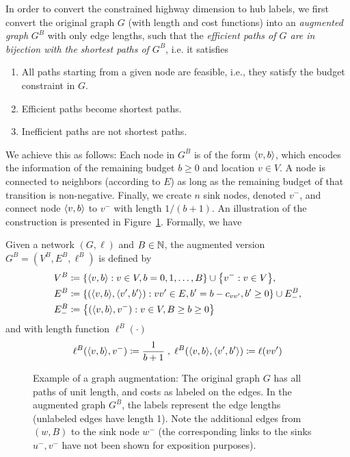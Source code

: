 \label{sec:augmented}
In order to convert the constrained highway dimension to hub labels, we first convert the original graph $G$ (with length and cost functions) into an \emph{augmented graph} $G^B$ with only edge lengths, such that the \emph{efficient paths of $G$ are in bijection with the shortest paths of $G^B$}, i.e. it satisfies
\begin{enumerate}[nosep]
\item All paths starting from a given node are feasible, i.e., they satisfy the budget constraint in $G$.
\item Efficient paths become shortest paths.
\item Inefficient paths are not shortest paths.
\end{enumerate}
We achieve this as follows: Each node in $G^B$ is of the form $\langle v,b\rangle$, which encodes the information of the remaining budget $b\geq 0$ and location $v\in V$.
A node is connected to neighbors (according to $E$) as long as the remaining budget of that transition is non-negative.
Finally, we create $n$ sink nodes, denoted $v^-$, and connect node $\langle v,b\rangle$ to $v^-$ with length $1/(b+1)$.
An illustration of the construction is presented in Figure~\ref{fig:augmented}.
Formally, we have
\begin{definition}
Given a network $(G,\ell)$ and $B\in\mathbb{N}$, the augmented version $G^B=(V^B,E^B,\ell^B)$ is defined by
\begin{align*}
V^B &\defeq\crl*{\pp{v,b}: v\in V, b=0,1,\ldots,B}\cup\crl*{v^-:v\in V},\\
E^B &\defeq\crl*{(\pp{v,b},\pp{v',b'}) : vv'\in E, b'=b-c_{vv'}, b'\geq 0}\cup E^{B}_{-},\\
E^{B}_{-} &\defeq \crl*{(\pp{v,b},v^-): v\in V, B\geq b\geq 0}
\end{align*}
and with length function $\ell^B(\cdot)$
\begin{align*}
\ell^B(\langle v,b\rangle,v^-) \coloneqq \frac{1}{b+1}\;,\;
\ell^B(\langle v,b\rangle,\langle v',b'\rangle) \coloneqq \ell(vv')
\end{align*}
\end{definition}



\begin{figure}

\caption{Example of a graph augmentation: The original graph $G$ has all paths of unit length, and costs as labeled on the edges. In the augmented graph $G^B$, the labels represent the edge lengths (unlabeled edges have length 1). Note the additional edges from $(w,B)$ to the sink node $w^-$ (the corresponding links to the sinks $u^-,v^-$ have not been shown for exposition purposes). 
}
\label{fig:augmented}
\end{figure}


